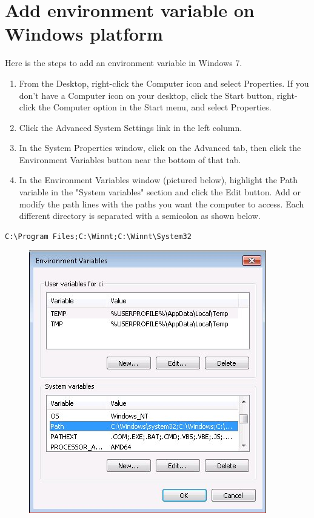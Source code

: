 \section{Add environment variable on Windows platform}\label{sec:ANNEXEEnvironmentVariableWindows}
Here is the steps to add an environment variable in Windows 7.
\begin{enumerate}
\item From the Desktop, right-click the Computer icon and select Properties. If you don't have a Computer icon on your desktop, click the Start button, right-click the Computer option in the Start menu, and select Properties.
\item Click the Advanced System Settings link in the left column.
\item In the System Properties window, click on the Advanced tab, then click the Environment Variables button near the bottom of that tab.
\item In the Environment Variables window (pictured below), highlight the Path variable in the "System variables" section and click the Edit button. Add or modify the path lines with the paths you want the computer to access. Each different directory is separated with a semicolon as shown below.

\end{enumerate}

\lstset{style=customBash}
\begin{lstlisting}
C:\Program Files;C:\Winnt;C:\Winnt\System32
\end{lstlisting}

\begin{figure}[!h] %
\centering
\includegraphics[scale=0.5]{images/EnvironmentVariable.jpeg}
\label{fig:EnvironmentVariable}
\end{figure}



